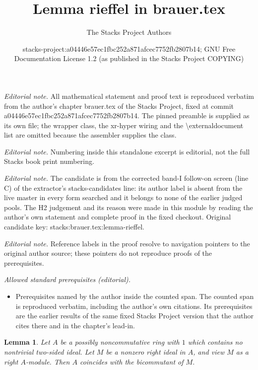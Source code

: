 \documentclass[10pt,a4paper]{amsart}
\title{Lemma rieffel in brauer.tex}
\author{The Stacks Project Authors}
\date{stacks-project:a04446e57ec1fbc252a871afcec7752fb2807b14; GNU Free Documentation License 1.2 (as published in the Stacks Project COPYING)}
\theoremstyle{plain}
\newtheorem{lemma}[subsection]{Lemma}
\theoremstyle{definition}
\theoremstyle{remark}
\numberwithin{equation}{subsection}
\begin{document}
\maketitle
\noindent\textit{Editorial note.} All mathematical statement and proof text is reproduced verbatim from the author's chapter brauer.tex of the Stacks Project, fixed at commit a04446e57ec1fbc252a871afcec7752fb2807b14. The pinned preamble is supplied as its own file; the wrapper class, the xr-hyper wiring and the \textbackslash{}externaldocument list are omitted because the assembler supplies the class.\par\medskip
\noindent\textit{Editorial note.} Numbering inside this standalone excerpt is editorial, not the full Stacks book print numbering.\par\medskip
\noindent\textit{Editorial note.} The candidate is from the corrected band-I follow-on screen (line C) of the extractor's stacks-candidates line: its author label is absent from the live master in every form searched and it belongs to none of the earlier judged pools. The H2 judgement and its reason were made in this module by reading the author's own statement and complete proof in the fixed checkout. Original candidate key: stacks:brauer.tex:lemma-rieffel.\par\medskip
\noindent\textit{Editorial note.} Reference labels in the proof resolve to navigation pointers to the original author source; these pointers do not reproduce proofs of the prerequisites.\par\medskip
\noindent\textit{Allowed standard prerequisites (editorial).}\begin{itemize}
\item Prerequisites named by the author inside the counted span. The counted span is reproduced verbatim, including the author's own citations. Its prerequisites are the earlier results of the same fixed Stacks Project version that the author cites there and in the chapter's lead-in.
\end{itemize}\medskip
\begin{lemma}
\label{lemma-rieffel}
Let $A$ be a possibly noncommutative ring with $1$ which contains no
nontrivial two-sided ideal. Let $M$ be a nonzero right ideal in $A$,
and view $M$ as a right $A$-module. Then $A$ coincides with the
bicommutant of $M$.
\end{lemma}
\end{document}
